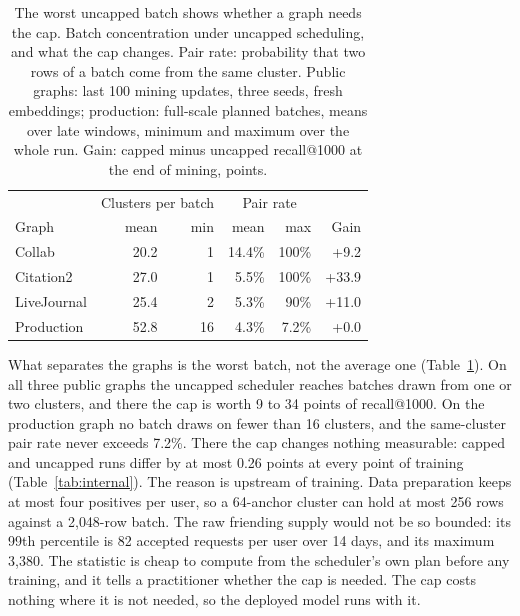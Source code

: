 \begin{table}[t]
  \caption{The worst uncapped batch shows whether a graph needs the cap. Batch concentration under uncapped scheduling,
  and what the cap changes. Pair rate: probability that two rows of a batch come from the same cluster. Public graphs: last 100 mining updates, three seeds, fresh embeddings;
  production: full-scale planned batches, means over late windows, minimum and maximum over the whole run. Gain: capped minus uncapped recall@1000 at the end of mining,
  points.}
  \label{tab:concentration}
  \footnotesize\setlength{\tabcolsep}{4pt}
  \begin{tabular}{lrrrrr}
    \toprule
    & \multicolumn{2}{c}{Clusters per batch} & \multicolumn{2}{c}{Pair rate} & \\
    Graph & mean & min & mean & max & Gain \\
    \midrule
    Collab & 20.2 & 1 & 14.4\% & 100\% & +9.2 \\
    Citation2 & 27.0 & 1 & 5.5\% & 100\% & +33.9 \\
    LiveJournal & 25.4 & 2 & 5.3\% & 90\% & +11.0 \\
    Production & 52.8 & 16 & 4.3\% & 7.2\% & +0.0 \\
    \bottomrule
  \end{tabular}
\end{table}

 What separates the graphs is the worst batch, not the average one
(Table~\ref{tab:concentration}). On all three public graphs the uncapped scheduler reaches batches drawn from one or
two clusters, and there the cap is worth 9 to 34 points of recall@1000. On the production graph no batch draws on fewer
than 16 clusters, and the same-cluster pair rate never exceeds 7.2\%. There the cap changes nothing measurable: capped
and uncapped runs differ by at most 0.26 points at every point of training (Table~\ref{tab:internal}). The reason is
upstream of training. Data preparation keeps at most four positives per user, so a 64-anchor cluster can hold at most
256 rows against a 2{,}048-row batch. The raw friending supply would not be so bounded: its 99th percentile is 82
accepted requests per user over 14 days, and its maximum 3{,}380. The statistic is cheap to compute from the
scheduler's own plan before any training, and it tells a practitioner whether the cap is needed. The cap costs nothing
where it is not needed, so the deployed model runs with it.
